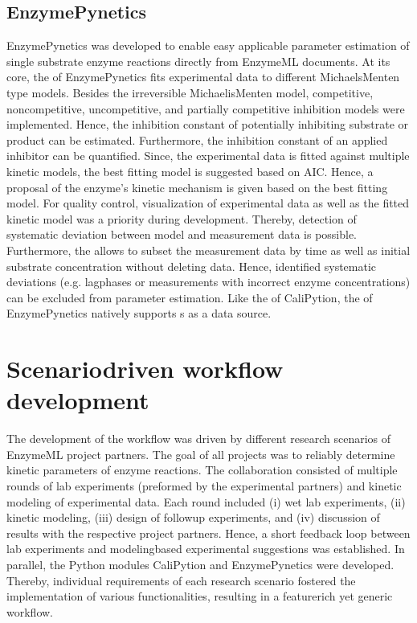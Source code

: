 \documentclass[letterpaper,12pt,english]{jupyterBook}
\begin{document}
\subsection{EnzymePynetics}
\label{\detokenize{results:enzymepynetics}}
\sphinxAtStartPar
EnzymePynetics was developed to enable easy applicable parameter estimation of single substrate enzyme reactions directly from EnzymeML documents. At its core, the  of EnzymePynetics fits experimental data to different Michaels\sphinxhyphen{}Menten type models. Besides the irreversible Michaelis\sphinxhyphen{}Menten model, competitive, non\sphinxhyphen{}competitive, uncompetitive, and partially competitive inhibition models were implemented. Hence, the inhibition constant of potentially inhibiting substrate or product can be estimated. Furthermore, the inhibition constant of an applied inhibitor can be quantified. Since, the experimental data is fitted against multiple kinetic models, the best fitting model is suggested based on AIC. Hence, a proposal of the enzyme’s kinetic mechanism is given based on the best fitting model.
For quality control, visualization of experimental data as well as the fitted kinetic model was a priority during development. Thereby, detection of systematic deviation between model and measurement data is possible. Furthermore, the  allows to subset the measurement data by time as well as initial substrate concentration without deleting data. Hence, identified systematic deviations (e.g. lag\sphinxhyphen{}phases or measurements with incorrect enzyme concentrations) can be excluded from parameter estimation. Like the  of CaliPytion, the  of EnzymePynetics natively supports s as a data source.


\section{Scenario\sphinxhyphen{}driven workflow development}
\label{\detokenize{results:scenario-driven-workflow-development}}
\sphinxAtStartPar
The development of the workflow was driven by different research scenarios of EnzymeML project partners. The goal of all projects was to reliably determine kinetic parameters of enzyme reactions.
The collaboration consisted of multiple rounds of lab experiments (preformed by the experimental partners) and kinetic modeling of experimental data. Each round included (i) wet lab experiments, (ii) kinetic modeling, (iii) design of follow\sphinxhyphen{}up experiments, and (iv) discussion of results with the respective project partners. Hence, a short feedback loop between lab experiments and modeling\sphinxhyphen{}based experimental suggestions was established. In parallel, the Python modules CaliPytion and EnzymePynetics were developed. Thereby, individual requirements of each research scenario fostered the implementation of various functionalities, resulting in a feature\sphinxhyphen{}rich yet generic workflow.
\end{document}
